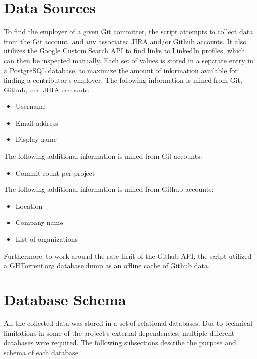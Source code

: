 \section{Data Sources}

To find the employer of a given Git committer, the script attempts to collect data from the Git account, and any associated JIRA and/or Github accounts. It also utilizes the Google Custom Search API to find links to LinkedIn profiles, which can then be inspected manually. Each set of values is stored in a separate entry in a PostgreSQL database, to maximize the amount of information available for finding a contributor's employer.
The following information is mined from Git, Github, and JIRA accounts:
\begin{itemize}
	\item Username
	\item Email address
	\item Display name
\end{itemize}
The following additional information is mined from Git accounts:
\begin{itemize}
	\item Commit count per project
\end{itemize}
The following additional information is mined from Github accounts:
\begin{itemize}
	\item Location
	\item Company name
	\item List of organizations
\end{itemize}
Furthermore, to work around the rate limit of the Github API, the script utilized a GHTorrent.org database dump as an offline cache of Github data.

 

\section{Database Schema}
All the collected data was stored in a set of relational databases. Due to technical limitations in some of the project's external dependencies, multiple different databases were required. The following subsections describe the purpose and schema of each database.
